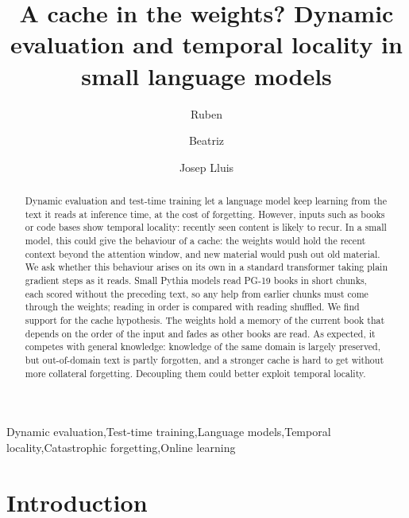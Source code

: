 \documentclass[times,twocolumn,final,authoryear]{elsarticle}
\begin{document}
\begin{frontmatter}

\title{A cache in the weights? Dynamic evaluation and temporal locality in small language models}

\author[1]{Ruben }
\author[1]{Beatriz }
\author[1]{Josep Lluis }

\address[1]{Department of Computer Architecture, Universitat Polit\`ecnica de Catalunya, Jordi Girona 1-3, 08034 Barcelona, Spain}

\begin{abstract}
Dynamic evaluation and test-time training let a language model keep learning from the text it reads at inference time, at the cost of forgetting.
However, inputs such as books or code bases show temporal locality: recently seen content is likely to recur.
In a small model, this could give the behaviour of a cache: the weights would hold the recent context beyond the attention window, and new material would push out old material.
We ask whether this behaviour arises on its own in a standard transformer taking plain gradient steps as it reads.
Small Pythia models read PG-19 books in short chunks, each scored without the preceding text, so any help from earlier chunks must come through the weights; reading in order is compared with reading shuffled.
We find support for the cache hypothesis.
The weights hold a memory of the current book that depends on the order of the input and fades as other books are read.
As expected, it competes with general knowledge: knowledge of the same domain is largely preserved, but out-of-domain text is partly forgotten, and a stronger cache is hard to get without more collateral forgetting.
Decoupling them could better exploit temporal locality.
\end{abstract}

\begin{keyword}
\KWD Dynamic evaluation\sep Test-time training\sep Language models\sep Temporal locality\sep Catastrophic forgetting\sep Online learning
\end{keyword}

\end{frontmatter}

\section{Introduction}
\end{document}

